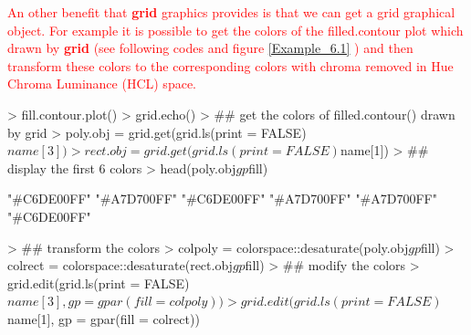 \documentclass[paper=a4, fontsize=11pt]{report}
\begin{document}
\textcolor{red}{
An other benefit that \textbf{grid} graphics provides is that we can get a grid graphical object. For example it is possible to get the colors of the filled.contour plot which drawn by \textbf{grid} (see following codes and figure \ref{Example_6.1} ) and then transform these colors to the corresponding colors with chroma removed in Hue Chroma Luminance (HCL) space.}
\begin{Schunk}
\begin{Sinput}
> fill.contour.plot()
> grid.echo()
> ## get the colors of filled.contour() drawn by grid
> poly.obj = grid.get(grid.ls(print = FALSE)$name[3])
> rect.obj = grid.get(grid.ls(print = FALSE)$name[1])
> ## display the first 6 colors
> head(poly.obj$gp$fill)
\end{Sinput}
\begin{Soutput}
[1] "#C6DE00FF" "#A7D700FF" "#C6DE00FF" "#A7D700FF" "#A7D700FF" "#C6DE00FF"
\end{Soutput}
\begin{Sinput}
> ## transform the colors
> colpoly = colorspace::desaturate(poly.obj$gp$fill)
> colrect = colorspace::desaturate(rect.obj$gp$fill)
> ## modify the colors
> grid.edit(grid.ls(print = FALSE)$name[3], gp = gpar(fill = colpoly))
> grid.edit(grid.ls(print = FALSE)$name[1], gp = gpar(fill = colrect))
\end{Sinput}
\end{Schunk}
\end{document}
